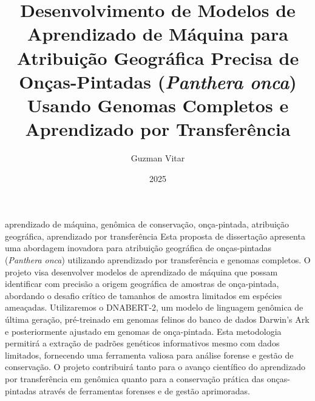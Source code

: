 \documentclass[english,oneside]{pucrs-ppgcc}
\author{Guzman Vitar}
\title{Desenvolvimento de Modelos de Aprendizado de Máquina para Atribuição Geográfica Precisa de Onças-Pintadas (\textit{Panthera onca}) Usando Genomas Completos e Aprendizado por Transferência}
      {Development of Machine Learning Models for Precise Geographic Assignment of Jaguars (\textit{Panthera onca}) Using Complete Genomes and Transfer Learning}
\date{2025}
\begin{document}





\begin{agradecimentos}
\end{agradecimentos}


\begin{resumo}{aprendizado de máquina, genômica de conservação, onça-pintada, atribuição geográfica, aprendizado por transferência}
Esta proposta de dissertação apresenta uma abordagem inovadora para atribuição geográfica de onças-pintadas (\textit{Panthera onca}) utilizando aprendizado por transferência e genomas completos. O projeto visa desenvolver modelos de aprendizado de máquina que possam identificar com precisão a origem geográfica de amostras de onça-pintada, abordando o desafio crítico de tamanhos de amostra limitados em espécies ameaçadas. Utilizaremos o DNABERT-2, um modelo de linguagem genômica de última geração, pré-treinado em genomas felinos do banco de dados Darwin's Ark e posteriormente ajustado em genomas de onça-pintada. Esta metodologia permitirá a extração de padrões genéticos informativos mesmo com dados limitados, fornecendo uma ferramenta valiosa para análise forense e gestão de conservação. O projeto contribuirá tanto para o avanço científico do aprendizado por transferência em genômica quanto para a conservação prática das onças-pintadas através de ferramentas forenses e de gestão aprimoradas.
\end{resumo}
\end{document}
